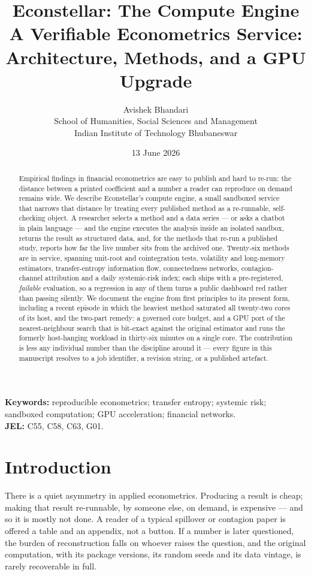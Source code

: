 \documentclass[11pt]{article}
\title{\textbf{Econstellar: The Compute Engine}\\[2pt]
\large A Verifiable Econometrics Service: Architecture, Methods, and a GPU Upgrade}
\author{Avishek Bhandari\\[2pt]
\normalsize School of Humanities, Social Sciences and Management\\
\normalsize Indian Institute of Technology Bhubaneswar}
\date{13 June 2026}
\begin{document}
\maketitle

\begin{abstract}
\noindent Empirical findings in financial econometrics are easy to publish and
hard to re-run: the distance between a printed coefficient and a number a reader
can reproduce on demand remains wide. We describe Econstellar's compute engine, a
small sandboxed service that narrows that distance by treating every published
method as a re-runnable, self-checking object. A researcher selects a method and a
data series --- or asks a chatbot in plain language --- and the engine executes
the analysis inside an isolated sandbox, returns the result as structured data,
and, for the methods that re-run a published study, reports how far the live
number sits from the archived one. Twenty-six methods are in service, spanning
unit-root and cointegration tests, volatility and long-memory estimators,
transfer-entropy information flow, connectedness networks, contagion-channel
attribution and a daily systemic-risk index; each ships with a pre-registered,
\emph{failable} evaluation, so a regression in any of them turns a public
dashboard red rather than passing silently. We document the engine from first
principles to its present form, including a recent episode in which the heaviest
method saturated all twenty-two cores of its host, and the two-part remedy: a
governed core budget, and a GPU port of the nearest-neighbour search that is
bit-exact against the original estimator and runs the formerly host-hanging
workload in thirty-six minutes on a single core. The contribution is less any
individual number than the discipline around it --- every figure in this
manuscript resolves to a job identifier, a revision string, or a published
artefact.
\end{abstract}

\noindent\textbf{Keywords:} reproducible econometrics; transfer entropy; systemic
risk; sandboxed computation; GPU acceleration; financial networks.\\
\textbf{JEL:} C55, C58, C63, G01.

\section{Introduction}
There is a quiet asymmetry in applied econometrics. Producing a result is
cheap; making that result re-runnable, by someone else, on demand, is
expensive --- and so it is mostly not done. A reader of a typical spillover or
contagion paper is offered a table and an appendix, not a button. If a number is
later questioned, the burden of reconstruction falls on whoever raises the
question, and the original computation, with its package versions, its random
seeds and its data vintage, is rarely recoverable in full.
\end{document}
